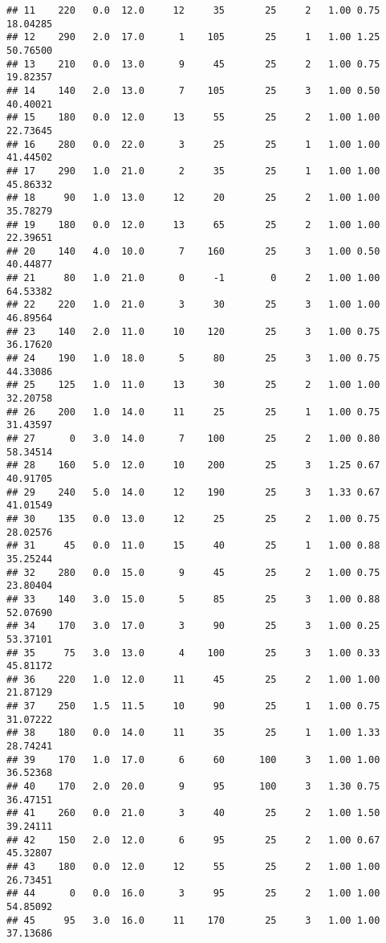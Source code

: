 \documentclass[
]{article}
\begin{document}
\begin{verbatim}
## 11    220   0.0  12.0     12     35       25     2   1.00 0.75 18.04285
## 12    290   2.0  17.0      1    105       25     1   1.00 1.25 50.76500
## 13    210   0.0  13.0      9     45       25     2   1.00 0.75 19.82357
## 14    140   2.0  13.0      7    105       25     3   1.00 0.50 40.40021
## 15    180   0.0  12.0     13     55       25     2   1.00 1.00 22.73645
## 16    280   0.0  22.0      3     25       25     1   1.00 1.00 41.44502
## 17    290   1.0  21.0      2     35       25     1   1.00 1.00 45.86332
## 18     90   1.0  13.0     12     20       25     2   1.00 1.00 35.78279
## 19    180   0.0  12.0     13     65       25     2   1.00 1.00 22.39651
## 20    140   4.0  10.0      7    160       25     3   1.00 0.50 40.44877
## 21     80   1.0  21.0      0     -1        0     2   1.00 1.00 64.53382
## 22    220   1.0  21.0      3     30       25     3   1.00 1.00 46.89564
## 23    140   2.0  11.0     10    120       25     3   1.00 0.75 36.17620
## 24    190   1.0  18.0      5     80       25     3   1.00 0.75 44.33086
## 25    125   1.0  11.0     13     30       25     2   1.00 1.00 32.20758
## 26    200   1.0  14.0     11     25       25     1   1.00 0.75 31.43597
## 27      0   3.0  14.0      7    100       25     2   1.00 0.80 58.34514
## 28    160   5.0  12.0     10    200       25     3   1.25 0.67 40.91705
## 29    240   5.0  14.0     12    190       25     3   1.33 0.67 41.01549
## 30    135   0.0  13.0     12     25       25     2   1.00 0.75 28.02576
## 31     45   0.0  11.0     15     40       25     1   1.00 0.88 35.25244
## 32    280   0.0  15.0      9     45       25     2   1.00 0.75 23.80404
## 33    140   3.0  15.0      5     85       25     3   1.00 0.88 52.07690
## 34    170   3.0  17.0      3     90       25     3   1.00 0.25 53.37101
## 35     75   3.0  13.0      4    100       25     3   1.00 0.33 45.81172
## 36    220   1.0  12.0     11     45       25     2   1.00 1.00 21.87129
## 37    250   1.5  11.5     10     90       25     1   1.00 0.75 31.07222
## 38    180   0.0  14.0     11     35       25     1   1.00 1.33 28.74241
## 39    170   1.0  17.0      6     60      100     3   1.00 1.00 36.52368
## 40    170   2.0  20.0      9     95      100     3   1.30 0.75 36.47151
## 41    260   0.0  21.0      3     40       25     2   1.00 1.50 39.24111
## 42    150   2.0  12.0      6     95       25     2   1.00 0.67 45.32807
## 43    180   0.0  12.0     12     55       25     2   1.00 1.00 26.73451
## 44      0   0.0  16.0      3     95       25     2   1.00 1.00 54.85092
## 45     95   3.0  16.0     11    170       25     3   1.00 1.00 37.13686

\end{verbatim}
\end{document}
